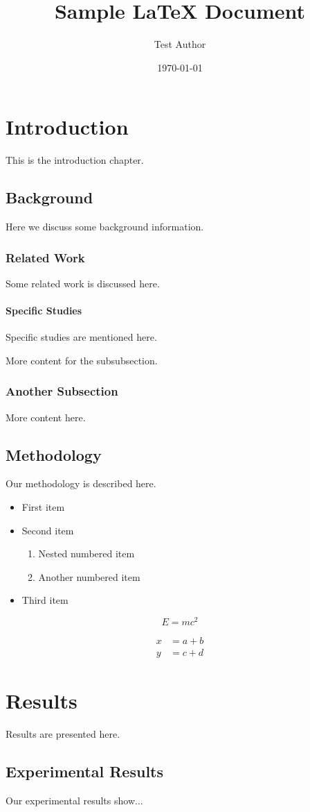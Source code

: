 \documentclass{article}
\title{Sample LaTeX Document}
\author{Test Author}
\date{\today}
\begin{document}
\maketitle

\chapter{Introduction}
This is the introduction chapter.

\section{Background}
Here we discuss some background information.

\subsection{Related Work}
Some related work is discussed here.

\subsubsection{Specific Studies}
Specific studies are mentioned here.

More content for the subsubsection.

\subsection{Another Subsection}
More content here.

\section{Methodology}
Our methodology is described here.

\begin{itemize}
\item First item
\item Second item
\begin{enumerate}
\item Nested numbered item
\item Another numbered item
\end{enumerate}
\item Third item
\end{itemize}

\begin{equation}
E = mc^2
\end{equation}

\begin{align}
x &= a + b \\
y &= c + d
\end{align}

\chapter{Results}
Results are presented here.

\section{Experimental Results}
Our experimental results show...
\end{document}

